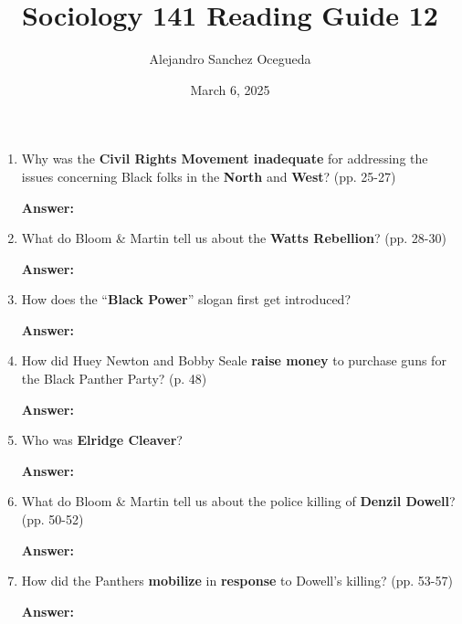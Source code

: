 \documentclass{article}
\title{Sociology 141 Reading Guide 12}
\author{Alejandro Sanchez Ocegueda}
\date{March 6, 2025}
\newcommand{\answer}{\textbf{Answer:}$\;$}
\begin{document}
\maketitle

\begin{enumerate}[label=\arabic*)]
    \item Why was the \textbf{Civil Rights Movement inadequate} for addressing the issues concerning Black folks in the \textbf{North} and \textbf{West}? (pp. 25-27)
    
    \answer 
    
    \item What do Bloom \& Martin tell us about the \textbf{Watts Rebellion}? (pp. 28-30)
    
    \answer 
    
    
    \item How does the ``\textbf{Black Power}'' slogan first get introduced?
   

    \answer
    
    \item How did Huey Newton and Bobby Seale \textbf{raise money} to purchase guns for the Black Panther Party? (p. 48)
    
    \answer 
    
    \item Who was \textbf{Elridge Cleaver}?
    
    \answer
    

    \item What do Bloom \& Martin tell us about the police killing of \textbf{Denzil Dowell}? (pp. 50-52)
    
    \answer
    
    \item How did the Panthers \textbf{mobilize} in \textbf{response} to Dowell's killing? (pp. 53-57)
    
    \answer
    
\end{enumerate}
 
\end{document}
